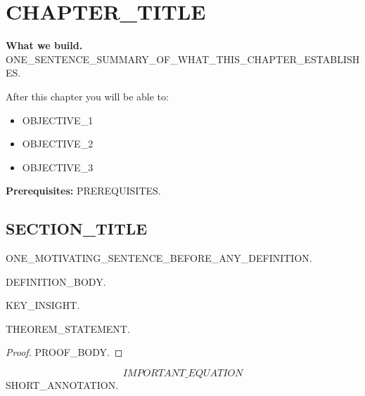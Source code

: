 
\chapter{CHAPTER\_TITLE}
\label{ch:LABEL}

\begin{roadmap}
\textbf{What we build.}
ONE_SENTENCE_SUMMARY_OF_WHAT_THIS_CHAPTER_ESTABLISHES.

After this chapter you will be able to:
\begin{itemize}[noitemsep]
  \item OBJECTIVE_1
  \item OBJECTIVE_2
  \item OBJECTIVE_3
\end{itemize}

\textbf{Prerequisites:} PREREQUISITES.
\end{roadmap}

\section{SECTION\_TITLE}
\label{sec:LABEL_sec1}

ONE_MOTIVATING_SENTENCE_BEFORE_ANY_DEFINITION.

\begin{definition}
\label{def:LABEL}
DEFINITION_BODY.
\end{definition}

\begin{keyidea}
KEY_INSIGHT.
\end{keyidea}

\begin{theorem}
\label{thm:LABEL}
THEOREM_STATEMENT.
\end{theorem}

\begin{proof}
PROOF_BODY.
\end{proof}

\begin{keyeqn}
\begin{equation}
  IMPORTANT\_EQUATION
  \label{eq:LABEL}
\end{equation}
SHORT_ANNOTATION.
\end{keyeqn}

